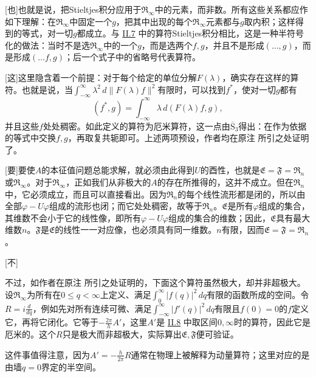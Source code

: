 \documentclass[fontsize=13pt,twoside,openany,headings=normal,parskip=false,bookmarkpackage=false,DIV=calc]{scrbook}
\begin{document}
[也]{也就是说，把Stieltjes积分应用于$\mathfrak R_\infty$中的元素，而非数。所有这些关系都应作如下理解：在$\mathfrak R_\infty$中固定一个$g$，把其中出现的每个$\mathfrak R_\infty$元素都与$g$取内积；这样得到的等式，对一切$g$都成立。与 \hyperref[sec:II.7]{II.7} 中的算符Stieltjes积分相比，这是一种半符号化的做法：当时不是选$\mathfrak R_\infty$中的一个$g$，而是选两个$f,\allowbreak g$，并且不是形成$(\ldots,\allowbreak g)$，而是形成$(\ldots f,\allowbreak g)$；后一个式子中的省略号代表算符。}

[这]{这里隐含着一个前提：对于每个给定的单位分解$F(\lambda)$，确实存在这样的算符。也就是说，当$\int_{-\infty}^{\infty}\lambda^2\,d\|F(\lambda)f\|^2$有限时，可以找到$f^*$，使对一切$g$都有
\[
(f^*,g)=\int_{-\infty}^{\infty}\lambda\,d(F(\lambda)f,g),
\]
并且这些$f$处处稠密。如此定义的算符为厄米算符，这一点由$\hyperref[cond:II.Sbar3]{\overline{\mathrm S}_3}$得出：在作为依据的等式中交换$f,\allowbreak g$，再取复共轭即可。上述两项预设，作者均在原注 \hyperlink{note-78}{} 所引之处证明了。}

[要]{要使$A$的本征值问题总能求解，就必须由此得到$U$的酉性，也就是$\mathfrak E=\mathfrak F=\mathfrak R_n$或$\mathfrak R_\infty$。对于$\mathfrak R_\infty$，正如我们从非极大的$A$的存在所推得的，这并不成立。但在$\mathfrak R_n$中，它必须成立，而且可以直接看出。因为$\mathfrak R_n$的每个线性流形都是闭的，所以由全部$\varphi-U\varphi$组成的流形也闭；而它处处稠密，故等于$\mathfrak R_n$。$\mathfrak E$是所有$\varphi$组成的集合，其维数不会小于它的线性像，即所有$\varphi-U\varphi$组成的集合的维数；因此，$\mathfrak E$具有最大维数$n$。$\mathfrak F$是$\mathfrak E$的线性一一对应像，\hypertarget{origpage-248}{}\label{origpage-248}也必须具有同一维数。$n$有限，因而$\mathfrak E=\mathfrak F=\mathfrak R_n$。}

[不]{不过，如作者在原注 \hyperlink{note-78}{} 所引之处证明的，下面这个算符虽然极大，却并非超极大。设$\mathfrak R_\infty$为所有在$0\le q<\infty$上定义、满足$\int_0^\infty|f(q)|^2\,dq$有限的函数所成的空间。令$R=i\frac{d}{dq}$，例如先对所有连续可微、满足$\int_{-\infty}^{\infty}|f'(q)|^2\,dq$有限且$f(0)=0$的$f$定义它，再将它闭化。\tnote[。][它][原]{原书在$f'$的积分中印出的下限为$-\infty$，但前面把函数的定义域规定为$[0,\allowbreak \infty)$。这里保留原印下限。}它等于$-\frac{2\pi}{h}A'$，这里$A'$是 \hyperref[sec:II.8]{II.8} 中取区间$0,\allowbreak \infty$时的算符，因此它是厄米的。这个$R$只是极大而非超极大，实际算出$\mathfrak E,\allowbreak \mathfrak F$便可验证。

这件事值得注意，因为$A'=-\frac{h}{2\pi}R$通常在物理上被解释为动量算符；这里对应的是由墙$q=0$界定的半空间。}
\end{document}
